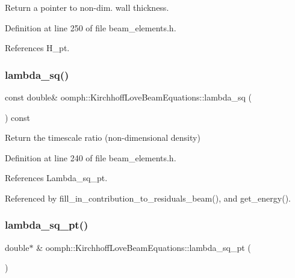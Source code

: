 Return a pointer to non-\/dim. wall thickness. 



Definition at line 250 of file beam\+\_\+elements.\+h.



References H\+\_\+pt.

\mbox{\label{classoomph_1_1KirchhoffLoveBeamEquations_a8dc173db47158b04c2613b946756a74f}} 
\subsubsection{\texorpdfstring{lambda\+\_\+sq()}{lambda\_sq()}}
{\footnotesize\ttfamily const double\& oomph\+::\+Kirchhoff\+Love\+Beam\+Equations\+::lambda\+\_\+sq (\begin{DoxyParamCaption}{ }\end{DoxyParamCaption}) const\hspace{0.3cm}{\ttfamily [inline]}}



Return the timescale ratio (non-\/dimensional density) 



Definition at line 240 of file beam\+\_\+elements.\+h.



References Lambda\+\_\+sq\+\_\+pt.



Referenced by fill\+\_\+in\+\_\+contribution\+\_\+to\+\_\+residuals\+\_\+beam(), and get\+\_\+energy().

\mbox{\label{classoomph_1_1KirchhoffLoveBeamEquations_a82ef550c7f4237fda4561dee0b20712a}} 
\subsubsection{\texorpdfstring{lambda\+\_\+sq\+\_\+pt()}{lambda\_sq\_pt()}}
{\footnotesize\ttfamily double$\ast$ \& oomph\+::\+Kirchhoff\+Love\+Beam\+Equations\+::lambda\+\_\+sq\+\_\+pt (\begin{DoxyParamCaption}{ }\end{DoxyParamCaption})\hspace{0.3cm}{\ttfamily [inline]}}




